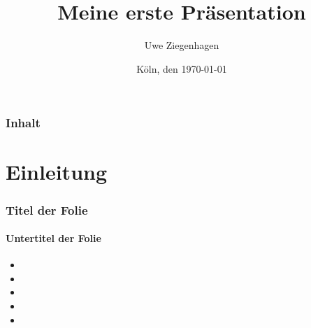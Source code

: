 \documentclass[ngerman]{beamer}
\title{Meine erste Präsentation}
\author{Uwe Ziegenhagen}
\date{Köln, den \today}
\institute{Dante e.V.}
\begin{document}
\begin{frame}

\maketitle

\end{frame}

\begin{frame}
\frametitle{Inhalt}

\tableofcontents

\end{frame}



\section{Einleitung}

\begin{frame}
\frametitle{Titel der Folie}
\framesubtitle{Untertitel der Folie}

\begin{itemize}
\item 
\item 
\item 
\item 
\item 
\end{itemize}


\end{frame}
\end{document}
